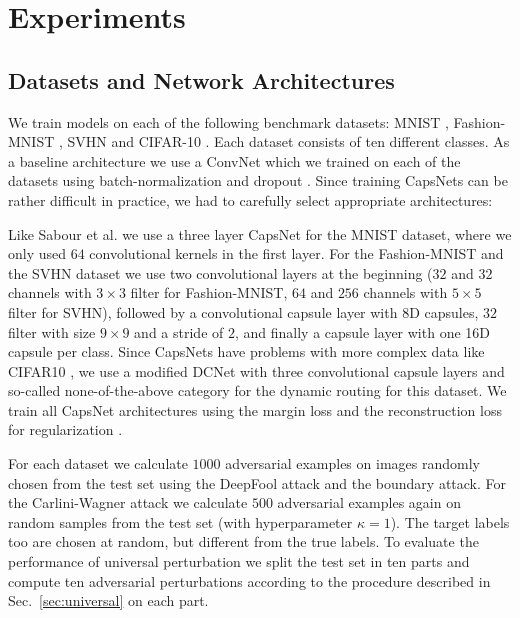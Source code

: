 \documentclass{article}
\begin{document}
\section{Experiments}
\label{lab:experiments}



\subsection{Datasets and Network Architectures}

We train models on each of the following benchmark datasets: MNIST
\cite{mnist}, Fashion-MNIST \cite{fashion}, SVHN \cite{svhn} and
CIFAR-10 \cite{cifar}. Each dataset consists of ten different
classes. As a baseline architecture we use a ConvNet which we trained
on each of the datasets using batch-normalization
\cite{batchnorm} and dropout \cite{dropout}. Since training CapsNets
can be rather difficult in practice, we had to carefully select
appropriate architectures:

Like Sabour et al.  we use a three layer CapsNet for
the MNIST dataset, where we only used $64$ convolutional kernels in
the first layer. For the Fashion-MNIST and the SVHN dataset we use two
convolutional layers at the beginning ($32$ and $32$ channels with
$3\times3$ filter for Fashion-MNIST, $64$ and $256$ channels with
$5\times5$ filter for SVHN), followed by a convolutional capsule layer
with $8$D capsules, $32$ filter with size $9\times9$ and a stride of
$2$, and finally a capsule layer with one 16D capsule per class. Since
CapsNets have problems with more complex data like CIFAR10
\cite{complex}, we use a modified DCNet \cite{denseanddiverse} with
three convolutional capsule layers and so-called none-of-the-above category for
the dynamic routing for this dataset. We train all CapsNet
architectures using the margin loss and the reconstruction loss for
regularization \cite{capsules}.

For each dataset we calculate $1000$ adversarial examples on images
randomly chosen from the test set using the DeepFool attack and the
boundary attack.  For the Carlini-Wagner attack we calculate $500$
adversarial examples again on random samples from the test set (with
hyperparameter $\kappa = 1$). The target labels too are chosen at
random, but different from the true labels. To evaluate the
performance of universal perturbation we split the test set in ten
parts and compute ten adversarial perturbations according to the
procedure described in Sec.~\ref{sec:universal} on each part.
\end{document}
